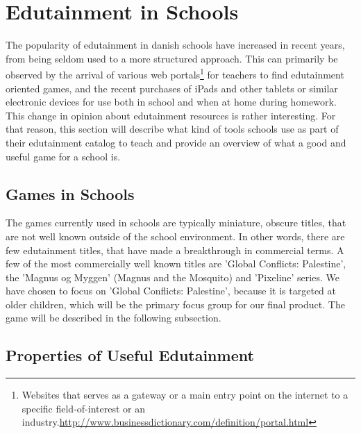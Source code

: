 \section{Edutainment in Schools}
\label{sec:eduinsch}
The popularity of edutainment in danish schools have increased in recent years, from being seldom used to a more structured approach. 
This can primarily be observed by the arrival of various web portals\footnote{Websites that serves as a gateway or a main entry point on the internet to a specific field-of-interest or an industry.\url{http://www.businessdictionary.com/definition/portal.html}} for teachers to find edutainment oriented games, and the recent purchases of iPads and other tablets or similar electronic devices for use both in school and when at home during homework.
This change in opinion about edutainment resources is rather interesting. For that reason, this section will describe what kind of tools schools use as part of their edutainment catalog to teach and provide an overview of what a good and useful game for a school is.


\subsection{Games in Schools}

The games currently used in schools are typically miniature, obscure titles, that are not well known outside of the school environment.
In other words, there are few edutainment titles, that have made a breakthrough in commercial terms.
A few of the most commercially well known titles are 'Global Conflicts: Palestine', the 'Magnus og Myggen' (Magnus and the Mosquito) and 'Pixeline' series.
We have chosen to focus on 'Global Conflicts: Palestine', because it is targeted at older children, which will be the primary focus group for our final product. The game will be described in the following subsection.

\subsection{Properties of Useful Edutainment}

